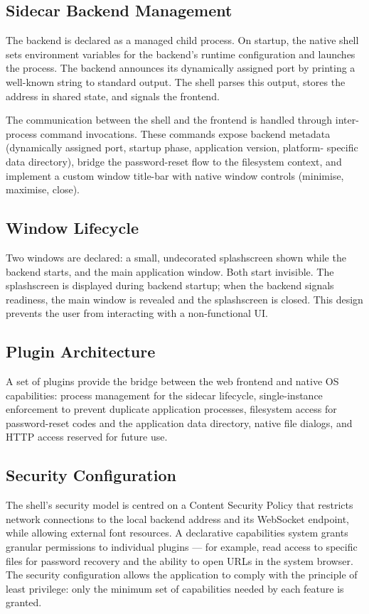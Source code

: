 \subsection{Sidecar Backend Management}

The backend is declared as a managed child process. On startup, the native
shell sets environment variables for the backend's runtime configuration and
launches the process. The backend announces its dynamically assigned port by
printing a well-known string to standard output. The shell parses this output,
stores the address in shared state, and signals the frontend.

The communication between the shell and the frontend is handled through
inter-process command invocations. These commands expose backend metadata
(dynamically assigned port, startup phase, application version, platform-
specific data directory), bridge the password-reset flow to the filesystem
context, and implement a custom window title-bar with native window controls
(minimise, maximise, close).

\subsection{Window Lifecycle}

Two windows are declared: a small, undecorated splashscreen shown while the
backend starts, and the main application window. Both start invisible. The
splashscreen is displayed during backend startup; when the backend signals
readiness, the main window is revealed and the splashscreen is closed. This
design prevents the user from interacting with a non-functional UI.

\subsection{Plugin Architecture}

A set of plugins provide the bridge between the web frontend and native OS
capabilities: process management for the sidecar lifecycle, single-instance
enforcement to prevent duplicate application processes, filesystem access for
password-reset codes and the application data directory, native file dialogs,
and HTTP access reserved for future use.

\subsection{Security Configuration}

The shell's security model is centred on a Content Security Policy that
restricts network connections to the local backend address and its WebSocket
endpoint, while allowing external font resources. A declarative capabilities
system grants granular permissions to individual plugins --- for example,
read access to specific files for password recovery and the ability to open
URLs in the system browser. The security configuration allows the application
to comply with the principle of least privilege: only the minimum set of
capabilities needed by each feature is granted.

